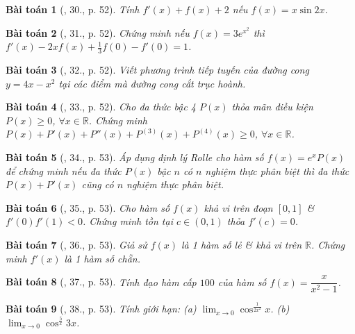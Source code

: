 \documentclass[oneside]{book}
\newtheorem{baitoan}{Bài toán}
\begin{document}
\begin{baitoan}[\cite{TLCT_BT_dai_so_giai_tich_11}, 30., p. 52]
	Tính $f'(x) + f(x) + 2$ nếu $f(x) = x\sin2x$.
\end{baitoan}

\begin{baitoan}[\cite{TLCT_BT_dai_so_giai_tich_11}, 31., p. 52]
	Chứng minh nếu $f(x) = 3e^{x^2}$ thì $f'(x) - 2xf(x) + \frac{1}{3}f(0) - f'(0) = 1$.
\end{baitoan}

\begin{baitoan}[\cite{TLCT_BT_dai_so_giai_tich_11}, 32., p. 52]
	Viết phương trình tiếp tuyến của đường cong $y = 4x - x^2$ tại các điểm mà đường cong cắt trục hoành.
\end{baitoan}

\begin{baitoan}[\cite{TLCT_BT_dai_so_giai_tich_11}, 33., p. 52]
	Cho đa thức bậc 4 $P(x)$ thỏa mãn điều kiện $P(x)\ge0$, $\forall x\in\mathbb{R}$. Chứng minh $P(x) + P'(x) + P''(x) + P^{(3)}(x) + P^{(4)}(x)\ge0$, $\forall x\in\mathbb{R}$.
\end{baitoan}

\begin{baitoan}[\cite{TLCT_BT_dai_so_giai_tich_11}, 34., p. 53]
	Áp dụng định lý Rolle cho hàm số $f(x) = e^xP(x)$ để chứng minh nếu đa thức $P(x)$ bậc $n$ có $n$ nghiệm thực phân biệt thì đa thức $P(x) + P'(x)$ cũng có $n$ nghiệm thực phân biệt.
\end{baitoan}

\begin{baitoan}[\cite{TLCT_BT_dai_so_giai_tich_11}, 35., p. 53]
	Cho hàm số $f(x)$ khả vi trên đoạn $[0,1]$ \& $f'(0)f'(1) < 0$. Chứng minh tồn tại $c\in(0,1)$ thỏa $f'(c) = 0$.
\end{baitoan}

\begin{baitoan}[\cite{TLCT_BT_dai_so_giai_tich_11}, 36., p. 53]
	Giả sử $f(x)$ là 1 hàm số lẻ \& khả vi trên $\mathbb{R}$. Chứng minh $f'(x)$ là 1 hàm số chẵn.
\end{baitoan}

\begin{baitoan}[\cite{TLCT_BT_dai_so_giai_tich_11}, 37., p. 53]
	Tính đạo hàm cấp $100$ của hàm số $f(x) = \dfrac{x}{x^2 - 1}$.
\end{baitoan}

\begin{baitoan}[\cite{TLCT_BT_dai_so_giai_tich_11}, 38., p. 53]
	Tính giới hạn: (a) $\lim_{x\to0} \cos^{\frac{1}{2x^2}} x$. (b) $\lim_{x\to0} \cos^{\frac{5}{x}} 3x$.
\end{baitoan}
\end{document}
